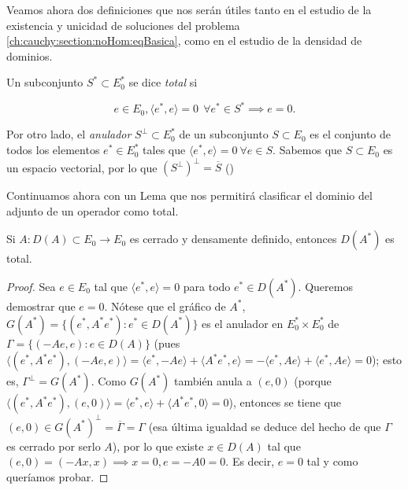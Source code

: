 Veamos ahora dos definiciones que nos serán útiles tanto en el estudio de la existencia y unicidad de soluciones del problema \eqref{ch:cauchy:section:noHom:eqBasica}, como en el estudio de la densidad de dominios.\\

\begin{Definicion}
    \label{ch:cauchy:section:noHom:def:totalYAnulador}
    Un subconjunto $S^* \subset E^*_0$ se dice \textit{total} si

    \[e \in E_0, \langle e^*, e \rangle = 0 \ \  \forall e^* \in S^* \implies e = 0.\]

    Por otro lado, el \textit{anulador} $S^\perp \subset E^*_0$ de un subconjunto $S \subset E_0$ es el conjunto de todos los elementos $e^* \in E_0^*$ tales que $\langle e^*, e \rangle = 0 \ \forall e \in S$. Sabemos que $S \subset E_0$ es un espacio vectorial, por lo que $(S^\perp)^\perp = \overline{S}$ (\cite[Proposición~1.9]{brezis-2011-fun-ana-sob})
\end{Definicion}

Continuamos ahora con un Lema que nos permitirá clasificar el dominio del adjunto de un operador como total.\\

\begin{Lema}
    \label{ch:cauchy:section:noHom:lema:dominioAdjTotal}

    Si $A : D(A) \subset E_0 \rightarrow E_0$ es cerrado y densamente definido, entonces $D(A^*)$ es total.
\end{Lema}

\begin{proof}
    Sea $e \in E_0$ tal que $\langle e^*, e \rangle = 0$ para todo $e^* \in D(A^*)$. Queremos demostrar que $e = 0$. Nótese que el gráfico de $A^*$, $G(A^*) = \{(e^*, A^*e^*) : e^* \in D(A^*)\}$ es el anulador en $E_0^* \times E_0^*$ de $\Gamma = \{(-Ae, e) : e \in D(A) \}$ (pues $\langle (e^*, A^*e^*), (-Ae, e)\rangle = \langle e^*, -Ae\rangle + \langle A^*e^*, e\rangle = -\langle e^*, Ae\rangle + \langle e^*, Ae\rangle = 0$); esto es, $\Gamma^\perp = G(A^*)$. Como $G(A^*)$ también anula a $(e,0)$ (porque $\langle (e^*, A^*e^*), (e,0)\rangle = \langle e^*, e\rangle + \langle A^*e^*, 0 \rangle = 0$), entonces se tiene que $(e,0) \in G(A^*)^\perp = \overline{\Gamma} = \Gamma$ (esa última igualdad se deduce del hecho de que $\Gamma$ es cerrado por serlo $A$), por lo que existe $x \in D(A)$ tal que $(e,0) = (-Ax, x) \implies x = 0, e = -A0 = 0$. Es decir, $e = 0$ tal y como queríamos probar.
\end{proof}

